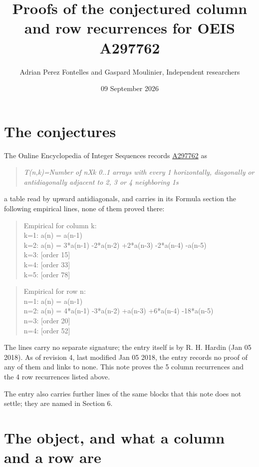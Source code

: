 \documentclass[11pt]{article}
\title{Proofs of the conjectured column and row recurrences for OEIS A297762}
\author{Adrian Perez Fontelles and Gaspard Moulinier, Independent researchers}
\date{09 September 2026}
\theoremstyle{definition}
\begin{document}
\maketitle
\section{The conjectures}

The Online Encyclopedia of Integer Sequences records \href{https://oeis.org/A297762}{A297762} as

\begin{quote}\itshape T(n,k)=Number of nXk 0..1 arrays with every 1 horizontally, diagonally or antidiagonally adjacent to 2, 3 or 4 neighboring 1s\end{quote}

a table read by upward antidiagonals, and carries in its Formula section the following empirical lines, none of them proved there:

\begin{quote}\ttfamily Empirical for column k:\\
k=1: a(n) = a(n-1)\\k=2: a(n) = 3*a(n-1) -2*a(n-2) +2*a(n-3) -2*a(n-4) -a(n-5)\\k=3: [order 15]\\k=4: [order 33]\\k=5: [order 78]\end{quote}

\begin{quote}\ttfamily Empirical for row n:\\
n=1: a(n) = a(n-1)\\n=2: a(n) = 4*a(n-1) -3*a(n-2) +a(n-3) +6*a(n-4) -18*a(n-5)\\n=3: [order 20]\\n=4: [order 52]\end{quote}

The lines carry no separate signature; the entry itself is by R. H. Hardin (Jan 05 2018). As of revision 4, last modified Jan 05 2018, the entry records no proof of any of them and links to none. This note proves the 5 column recurrences and the 4 row recurrences listed above.

The entry also carries further lines of the same blocks that this note does not settle; they are named in Section 6.

\section{The object, and what a column and a row are}
\end{document}
